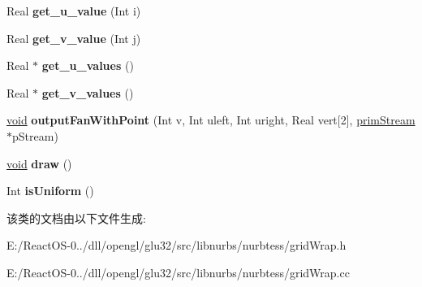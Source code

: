 \begin{DoxyCompactItemize}
\mbox{\label{classgrid_wrap_ad4ef3a6b71621a11dc192dac4bbb3e60}} 
Real {\bfseries get\+\_\+u\+\_\+value} (Int i)
\item 
\mbox{\label{classgrid_wrap_aaa0dc109c51bfd1d06cbc41a51c753ff}} 
Real {\bfseries get\+\_\+v\+\_\+value} (Int j)
\item 
\mbox{\label{classgrid_wrap_a49dd4e23117273c00570c209f824d154}} 
Real $\ast$ {\bfseries get\+\_\+u\+\_\+values} ()
\item 
\mbox{\label{classgrid_wrap_a0bca00bc40766884031b9f12ed769589}} 
Real $\ast$ {\bfseries get\+\_\+v\+\_\+values} ()
\item 
\mbox{\label{classgrid_wrap_af8f7b17f3e88d35ff3ec6bee6754aa33}} 
\hyperlink{interfacevoid}{void} {\bfseries output\+Fan\+With\+Point} (Int v, Int uleft, Int uright, Real vert\mbox{[}2\mbox{]}, \hyperlink{classprim_stream}{prim\+Stream} $\ast$p\+Stream)
\item 
\mbox{\label{classgrid_wrap_a73e0f67cc5f2fe5f71b016d5f148ae44}} 
\hyperlink{interfacevoid}{void} {\bfseries draw} ()
\item 
\mbox{\label{classgrid_wrap_a8ae01790768d1fc082e528ac258d7ddd}} 
Int {\bfseries is\+Uniform} ()
\end{DoxyCompactItemize}


该类的文档由以下文件生成\+:\begin{DoxyCompactItemize}
\item 
E\+:/\+React\+O\+S-\/0../dll/opengl/glu32/src/libnurbs/nurbtess/grid\+Wrap.\+h\item 
E\+:/\+React\+O\+S-\/0../dll/opengl/glu32/src/libnurbs/nurbtess/grid\+Wrap.\+cc\end{DoxyCompactItemize}
